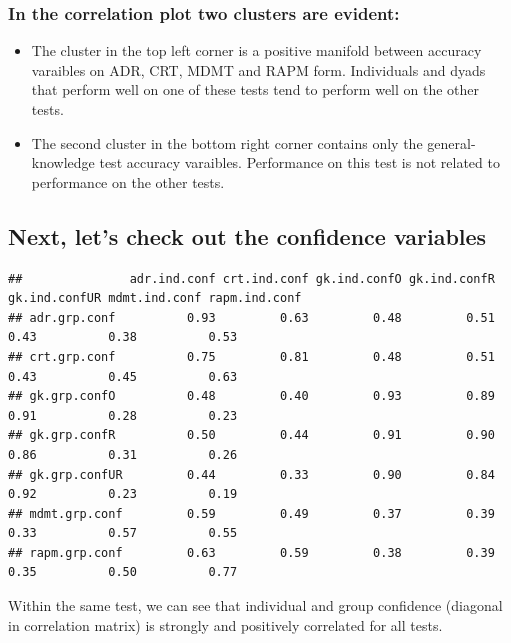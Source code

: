 \documentclass[]{article}
\providecommand{\tightlist}{%
  \setlength{\itemsep}{0pt}\setlength{\parskip}{0pt}}
\begin{document}
\subsubsection{In the correlation plot two clusters are
evident:}\label{in-the-correlation-plot-two-clusters-are-evident}

\begin{itemize}
\tightlist
\item
  The cluster in the top left corner is a positive manifold between
  accuracy varaibles on ADR, CRT, MDMT and RAPM form. Individuals and
  dyads that perform well on one of these tests tend to perform well on
  the other tests.
\item
  The second cluster in the bottom right corner contains only the
  general-knowledge test accuracy varaibles. Performance on this test is
  not related to performance on the other tests.
\end{itemize}

\subsection{Next, let's check out the confidence
variables}\label{next-lets-check-out-the-confidence-variables}

\begin{verbatim}
##               adr.ind.conf crt.ind.conf gk.ind.confO gk.ind.confR gk.ind.confUR mdmt.ind.conf rapm.ind.conf
## adr.grp.conf          0.93         0.63         0.48         0.51          0.43          0.38          0.53
## crt.grp.conf          0.75         0.81         0.48         0.51          0.43          0.45          0.63
## gk.grp.confO          0.48         0.40         0.93         0.89          0.91          0.28          0.23
## gk.grp.confR          0.50         0.44         0.91         0.90          0.86          0.31          0.26
## gk.grp.confUR         0.44         0.33         0.90         0.84          0.92          0.23          0.19
## mdmt.grp.conf         0.59         0.49         0.37         0.39          0.33          0.57          0.55
## rapm.grp.conf         0.63         0.59         0.38         0.39          0.35          0.50          0.77
\end{verbatim}

Within the same test, we can see that individual and group confidence
(diagonal in correlation matrix) is strongly and positively correlated
for all tests.
\end{document}
